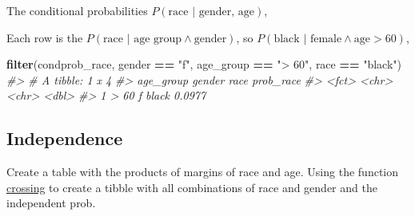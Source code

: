 \documentclass[]{book}
\newenvironment{Shaded}{\begin{snugshade}}{\end{snugshade}}
\newcommand{\CommentTok}[1]{\textcolor[rgb]{0.56,0.35,0.01}{\textit{#1}}}
\newcommand{\DataTypeTok}[1]{\textcolor[rgb]{0.13,0.29,0.53}{#1}}
\newcommand{\KeywordTok}[1]{\textcolor[rgb]{0.13,0.29,0.53}{\textbf{#1}}}
\newcommand{\NormalTok}[1]{#1}
\newcommand{\OperatorTok}[1]{\textcolor[rgb]{0.81,0.36,0.00}{\textbf{#1}}}
\newcommand{\StringTok}[1]{\textcolor[rgb]{0.31,0.60,0.02}{#1}}
\theoremstyle{definition}
\theoremstyle{definition}
\theoremstyle{definition}
\theoremstyle{remark}
\begin{document}
The conditional probabilities \(P(\text{race } | \text{ gender, age})\),

\begin{Shaded}
\end{Shaded}

Each row is the
\(P(\text{race } | \text{ age group} \land \text{gender})\), so
\(P(\text{black } | \text{ female} \land \text{age} > 60)\),

\begin{Shaded}
\begin{Highlighting}[]
\KeywordTok{filter}\NormalTok{(condprob_race, gender }\OperatorTok{==}\StringTok{ "f"}\NormalTok{, age_group }\OperatorTok{==}\StringTok{ "> 60"}\NormalTok{, race }\OperatorTok{==}\StringTok{ "black"}\NormalTok{)}
\CommentTok{#> # A tibble: 1 x 4}
\CommentTok{#>   age_group gender race  prob_race}
\CommentTok{#>   <fct>     <chr>  <chr>     <dbl>}
\CommentTok{#> 1 > 60      f      black    0.0977}
\end{Highlighting}
\end{Shaded}

\hypertarget{independence}{%
\subsection{Independence}\label{independence}}

Create a table with the products of margins of race and age. Using the
function
\href{https://www.rdocumentation.org/packages/tidyr/topics/crossing}{crossing}
to create a tibble with all combinations of race and gender and the
independent prob.
\end{document}
